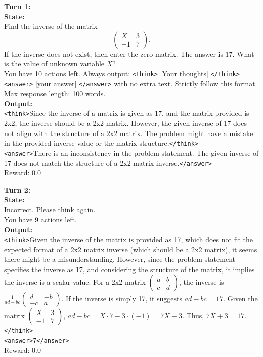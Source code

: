 \begin{tcolorbox}[breakable, colback=gray!2, colframe=black, boxrule=0.5pt, arc=2pt, width=\linewidth, title=Box 7: Model rollout after multi-turn RL training with UFO (Failure Case)]
\label{box:case4}
\textbf{Turn 1:} \\
\textbf{State:} \\
Find the inverse of the matrix
\[
\begin{pmatrix} X & 3 \\ -1 & 7 \end{pmatrix}.
\]
If the inverse does not exist, then enter the zero matrix. The answer is 17. What is the value of unknown variable \(X\)? \\
You have 10 actions left. Always output: \texttt{<think>} [Your thoughts] \texttt{</think>} \texttt{<answer>} [your answer] \texttt{</answer>} with no extra text. Strictly follow this format. Max response length: 100 words. \\
\textbf{Output:} \\
\texttt{<think>}Since the inverse of a matrix is given as 17, and the matrix provided is 2x2, the inverse should be a 2x2 matrix. However, the given inverse of 17 does not align with the structure of a 2x2 matrix. The problem might have a mistake in the provided inverse value or the matrix structure.\texttt{</think>} \\
\texttt{<answer>}There is an inconsistency in the problem statement. The given inverse of 17 does not match the structure of a 2x2 matrix inverse.\texttt{</answer>} \\
Reward: 0.0

\vspace{4pt}
\textbf{Turn 2:} \\
\textbf{State:} \\
Incorrect. Please think again. \\
You have 9 actions left. \\
\textbf{Output:} \\
\texttt{<think>}Given the inverse of the matrix is provided as 17, which does not fit the expected format of a 2x2 matrix inverse (which should be a 2x2 matrix), it seems there might be a misunderstanding. However, since the problem statement specifies the inverse as 17, and considering the structure of the matrix, it implies the inverse is a scalar value. For a 2x2 matrix \(\begin{pmatrix} a & b \\ c & d \end{pmatrix}\), the inverse is \(\frac{1}{ad-bc}\begin{pmatrix} d & -b \\ -c & a \end{pmatrix}\). If the inverse is simply 17, it suggests \(ad - bc = 17\). Given the matrix \(\begin{pmatrix} X & 3 \\ -1 & 7 \end{pmatrix}\), \(ad - bc = X \cdot 7 - 3 \cdot (-1) = 7X + 3\). Thus, \(7X + 3 = 17\).\texttt{</think>} \\
\texttt{<answer>}7\texttt{</answer>} \\
Reward: 0.0


\end{tcolorbox}

